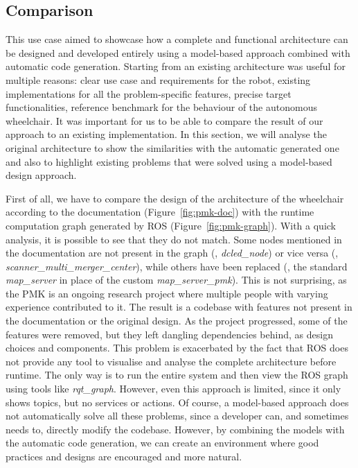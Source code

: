 \subsection{Comparison}
This use case aimed to showcase how a complete and functional architecture can be designed and developed entirely using a model-based approach combined with automatic code generation. Starting from an existing architecture was useful for multiple reasons: clear use case and requirements for the robot, existing implementations for all the problem-specific features, precise target functionalities, reference benchmark for the behaviour of the autonomous wheelchair. It was important for us to be able to compare the result of our approach to an existing implementation. In this section, we will analyse the original architecture to show the similarities with the automatic generated one and also to highlight existing problems that were solved using a model-based design approach.

First of all, we have to compare the design of the architecture of the wheelchair according to the documentation (Figure~\ref{fig:pmk-doc}) with the runtime computation graph generated by ROS (Figure~\ref{fig:pmk-graph}). With a quick analysis, it is possible to see that they do not match. Some nodes mentioned in the documentation are not present in the graph (\eg, \textit{dcled\_node}) or vice versa (\eg, \textit{scanner\_multi\_merger\_center}), while others have been replaced (\eg, the standard \textit{map\_server} in place of the custom \textit{map\_server\_pmk}). This is not surprising, as the PMK is an ongoing research project where multiple people with varying experience contributed to it. The result is a codebase with features not present in the documentation or the original design. As the project progressed, some of the features were removed, but they left dangling dependencies behind, as design choices and components. This problem is exacerbated by the fact that ROS does not provide any tool to visualise and analyse the complete architecture before runtime. The only way is to run the entire system and then view the ROS graph using tools like \textit{rqt\_graph}. However, even this approach is limited, since it only shows topics, but no services or actions. Of course, a model-based approach does not automatically solve all these problems, since a developer can, and sometimes needs to, directly modify the codebase. However, by combining the models with the automatic code generation, we can create an environment where good practices and designs are encouraged and more natural.

